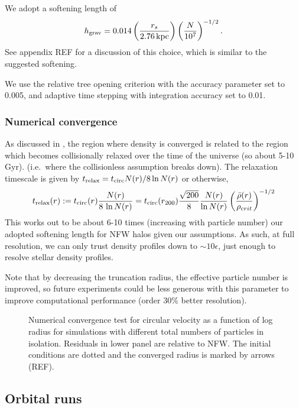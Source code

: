 We adopt a softening length of \[
h_{\rm grav} = 0.014 \left(\frac{r_s}{2.76\,{\rm kpc}}\right)\left(\frac{N}{10^7}\right)^{-1/2}.
\] See appendix REF for a discussion of this choice, which is similar to
the \citet{power+2003} suggested softening.

We use the relative tree opening criterion with the accuracy parameter
set to 0.005, and adaptive time stepping with integration accuracy set
to 0.01.

\subsubsection{Numerical convergence}\label{numerical-convergence}

As discussed in \citet{power+2003}, the region where density is
converged is related to the region which becomes collisionally relaxed
over the time of the universe (so about 5-10 Gyr). (i.e.~where the
collisionless assumption breaks down). The relaxation timescale is given
by \(t_{\rm relax} = t_{\rm circ} N(r) / 8\ln N(r)\) or otherwise, \[
t_{\rm relax}(r) := t_{\rm circ}(r) \frac{N(r)}{8\,\ln N(r)}
= {t_{\rm circ}(r_{200})} \frac{\sqrt{200}}{8} \frac{N(r)}{\ln N(r)} \left(\frac{\bar \rho (r)}{\rho_{\textrm crit}}\right)^{-1/2}
\] This works out to be about 6-10 times (increasing with particle
number) our adopted softening length for NFW halos given our
assumptions. As such, at full resolution, we can only trust density
profiles down to \(\sim10\epsilon\), just enough to resolve stellar
density profiles.

Note that by decreasing the truncation radius, the effective particle
number is improved, so future experiments could be less generous with
this parameter to improve computational performance (order 30\% better
resolution).

\begin{figure}
\centering
{}
\caption[Numerical halo convergence]{Numerical convergence test for
circular velocity as a function of log radius for simulations with
different total numbers of particles in isolation. Residuals in lower
panel are relative to NFW. The initial conditions are dotted and the
converged radius is marked by arrows
(REF).}\label{fig:numerical_convergance}
\end{figure}

\subsection{Orbital runs}\label{orbital-runs}


